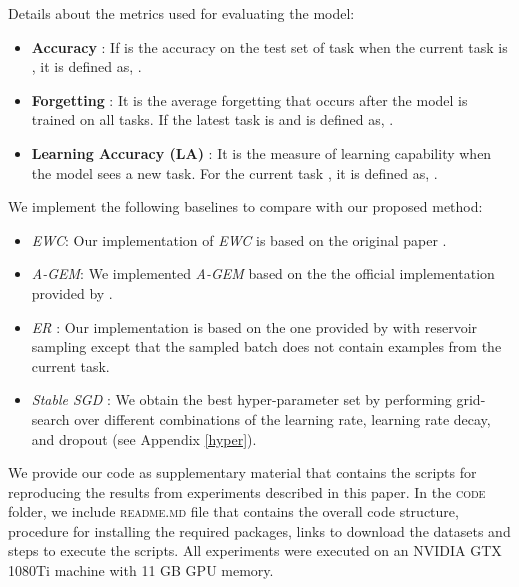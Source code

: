 \documentclass{article} \usepackage{collas2022_conference,times}
\begin{document}
Details about the metrics used for evaluating the model: 
    \begin{itemize}
        \item \textbf{Accuracy} \citep{lopez2017gradient}: If  is the accuracy on the test set of task  when the current task is , it is defined as,  
      .
        \item \textbf{Forgetting} \citep{chaudhry2018riemannian}: It is the average forgetting that occurs after the model is trained on all tasks. If the latest task is  and is defined as,
        .
        \item \textbf{Learning Accuracy (LA)} \citep{riemer2018learning}: It is the measure of learning capability when the model sees a new task. For the current task , it is defined as, 
        .
    \end{itemize}

{
We implement the following baselines to compare with our proposed method:
\begin{itemize}
    \item \textit{EWC}: Our implementation of \textit{EWC} is based on the original paper \citep{kirkpatrick2017overcoming}.
    \item \textit{A-GEM}: We implemented \textit{A-GEM} based on the the official implementation provided by \citep{chaudhry2018efficient}.
    \item \textit{ER} \citep{chaudhry2019tiny}: Our implementation is based on the one provided by \citep{aljundi2019online} with reservoir sampling except that the sampled batch does not contain examples from the current task. 
	\item \textit{Stable SGD} \citep{mirzadeh2020understanding}: We obtain the best hyper-parameter set by performing grid-search over different combinations of the learning rate, learning rate decay, and dropout (see Appendix \ref{hyper}). 
\end{itemize}
}


We provide our code as supplementary material that contains the scripts for reproducing the results from experiments described in this paper. In the \textsc{code} folder, we include \textsc{readme.md} file that contains the overall code structure, procedure for installing the required packages, links to download the datasets and steps to execute the scripts. All experiments were executed on an NVIDIA GTX 1080Ti machine with 11 GB GPU memory. 
\end{document}
